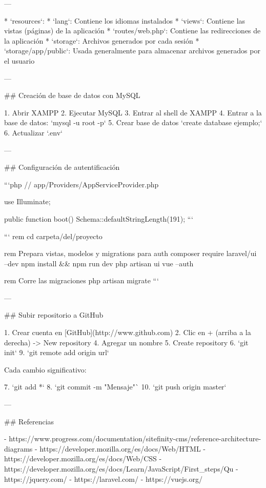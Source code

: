 ---

* `resources`:
	* `lang`: Contiene los idiomas instalados
	* `views`: Contiene las vistas (páginas) de la aplicación
* `routes/web.php`: Contiene las redirecciones de la aplicación
* `storage`: Archivos generados por cada sesión
	* `storage/app/public`: Usada generalmente para almacenar archivos generados por el usuario

---

## Creación de base de datos con MySQL

1. Abrir XAMPP
2. Ejecutar MySQL
3. Entrar al shell de XAMPP
4. Entrar a la base de datos:
`mysql -u root -p`
5. Crear base de datos
`create database ejemplo;`
6. Actualizar `.env`

---

## Configuración de autentificación

```php
// app/Providers/AppServiceProvider.php

use Illuminate\Support\Facades\Schema;

public function boot()
{
    Schema::defaultStringLength(191);
}
```

```
rem cd carpeta/del/proyecto

rem Prepara vistas, modelos y migrations para auth
composer require laravel/ui --dev
npm install && npm run dev
php artisan ui vue --auth

rem Corre las migraciones
php artisan migrate
```

---

## Subir repositorio a GitHub

1. Crear cuenta en [GitHub](http://www.github.com)
2. Clic en + (arriba a la derecha) -> New repository
4. Agregar un nombre
5. Create repository
6. `git init`
9. `git remote add origin url`

Cada cambio significativo:

7. `git add *`
8. `git commit -m "Mensaje"`
10. `git push origin master`

---

## Referencias

- https://www.progress.com/documentation/sitefinity-cms/reference-architecture-diagrams
- https://developer.mozilla.org/es/docs/Web/HTML
- https://developer.mozilla.org/es/docs/Web/CSS
- https://developer.mozilla.org/es/docs/Learn/JavaScript/First_steps/Qu%
- https://jquery.com/
- https://laravel.com/
- https://vuejs.org/
